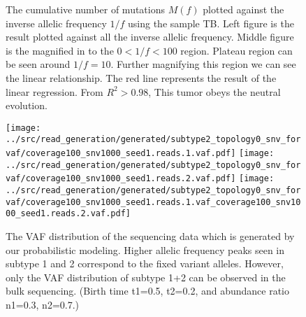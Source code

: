 \documentclass{article}
\begin{document}
\begin{figure}[H]
\begin{center}
 \caption{The cumulative number of mutations $M(f)$ plotted against the inverse allelic frequency $1/f$ using the sample TB.
 Left figure is the result plotted against all the inverse allelic frequency. Middle figure is the magnified in to the $0 < 1/f < 100$ region. Plateau region can be seen around $1/f = 10$. Further magnifying this region we can see the linear relationship. The red line represents the result of the linear regression. From $R^2 > 0.98$, This tumor obeys the neutral evolution.}
\end{center}
\end{figure}

\begin{figure}[H]
 \texttt{[image: ../src/read\_generation/generated/subtype2\_topology0\_snv\_forvaf/coverage100\_snv1000\_seed1.reads.1.vaf.pdf]}
 \texttt{[image: ../src/read\_generation/generated/subtype2\_topology0\_snv\_forvaf/coverage100\_snv1000\_seed1.reads.2.vaf.pdf]}
 \texttt{[image: ../src/read\_generation/generated/subtype2\_topology0\_snv\_forvaf/coverage100\_snv1000\_seed1.reads.1.vaf\_coverage100\_snv1000\_seed1.reads.2.vaf.pdf]}
 \caption{The VAF distribution of the sequencing data which is generated by our probabilistic modeling. Higher allelic frequency peaks seen in subtype 1 and 2 correspond to the fixed variant alleles. However, only the VAF distribution of subtype 1+2 can be observed in the bulk sequencing. (Birth time t1=0.5, t2=0.2, and abundance ratio n1=0.3,  n2=0.7.)}
 \label{VAF_distribution_generated}
\end{figure}
\end{document}
